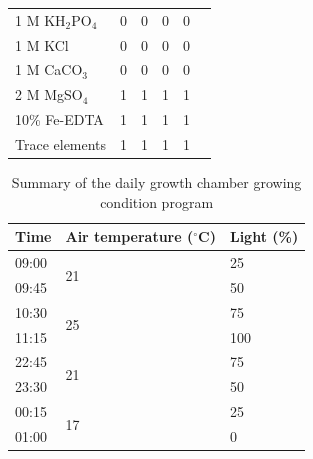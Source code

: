 \begin{table}[!h]
{\begin{tabular}{p{2.805cm}p{2cm}p{2cm}p{2cm}p{2cm}p{2cm}}
        1 M KH$_2$PO$_4$        & \multicolumn{1}{r}{0}         & \multicolumn{1}{r}{0}         & \multicolumn{1}{r}{0}         & \multicolumn{1}{r}{0}         &   \\
        1 M KCl                 & \multicolumn{1}{r}{0}         & \multicolumn{1}{r}{0}         & \multicolumn{1}{r}{0}         & \multicolumn{1}{r}{0}         &   \\
        1 M CaCO$_3$            & \multicolumn{1}{r}{0}         & \multicolumn{1}{r}{0}         & \multicolumn{1}{r}{0}         & \multicolumn{1}{r}{0}         &   \\
        2 M MgSO$_4$            & \multicolumn{1}{r}{1}         & \multicolumn{1}{r}{1}         & \multicolumn{1}{r}{1}         & \multicolumn{1}{r}{1}         &   \\
        10\% Fe-EDTA            & \multicolumn{1}{r}{1}         & \multicolumn{1}{r}{1}         & \multicolumn{1}{r}{1}         & \multicolumn{1}{r}{1}         &   \\
        Trace elements          & \multicolumn{1}{r}{1}         & \multicolumn{1}{r}{1}         & \multicolumn{1}{r}{1}         & \multicolumn{1}{r}{1}         &   \\
        \hline
\end{tabular}}
\end{table}
\clearpage

\newpage
\begin{table}[]
    \centering
    \caption{Summary of the daily growth chamber growing condition program}
    \label{table:tab.d2}
    \begin{tabular}{|p{2cm}|p{4.5cm}|p{2cm}|}
        \hline
        Time  & Air temperature ($^{\circ}$C)   & Light (\%) \\
        \hline
        09:00 & \multirow{2}{*}{21}             & 25         \\
        09:45 &                                 & 50         \\
        \hline
        10:30 & \multirow{2}{*}{25}             & 75         \\
        11:15 &                                 & 100        \\
        \hline
        22:45 & \multirow{2}{*}{21}             & 75         \\
        23:30 &                                 & 50         \\
        \hline
        00:15 & \multirow{2}{*}{17}             & 25         \\
        01:00 &                                 & 0          \\
        \hline      
    \end{tabular}%
\end{table}
\clearpage

